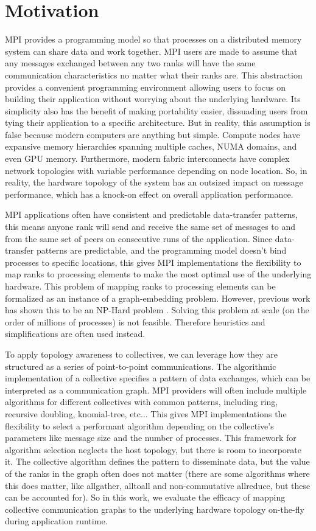 \section{Motivation}
MPI provides a programming model so that processes on a distributed memory system can share data and work together.
MPI users are made to assume that any messages exchanged between any two ranks will have the same communication characteristics no matter what their ranks are. 
This abstraction provides a convenient programming environment allowing users to focus on building their application without worrying about the underlying hardware. 
Its simplicity also has the benefit of making portability easier, dissuading users from tying their application to a specific architecture.
But in reality, this assumption is false because modern computers are anything but simple. 
Compute nodes have expansive memory hierarchies spanning multiple caches, NUMA domains, and even GPU memory.
Furthermore, modern fabric interconnects have complex network topologies with variable performance depending on node location.
So, in reality, the hardware topology of the system has an outsized impact on message performance, which has a knock-on effect on overall application performance. 

MPI applications often have consistent and predictable data-transfer patterns, this means anyone rank will send and receive the same set of messages to and from the same set of peers on consecutive runs of the application.
Since data-transfer patterns are predictable, and the programming model doesn't bind processes to specific locations, this gives MPI implementations the flexibility to map ranks to processing elements to make the most optimal use of the underlying hardware.
This problem of mapping ranks to processing elements can be formalized as an instance of a graph-embedding problem. However, previous work has shown this to be an NP-Hard problem \cite{Hoefler2011GenericTopoMappingStrats}. 
Solving this problem at scale (on the order of millions of processes) is not feasible. Therefore heuristics and simplifications are often used instead.

To apply topology awareness to collectives, we can leverage how they are structured as a series of point-to-point communications.
The algorithmic implementation of a collective specifies a pattern of data exchanges, which can be interpreted as a communication graph.
MPI providers will often include multiple algorithms for different collectives with common patterns, including ring, recursive doubling, knomial-tree, etc...
This gives MPI implementations the flexibility to select a performant algorithm depending on the collective's parameters like message size and the number of processes.
This framework for algorithm selection neglects the host topology, but there is room to incorporate it.
The collective algorithm defines the pattern to disseminate data, but the value of the ranks in the graph often  does not matter (there are some algorithms where this does matter, like allgather, alltoall and non-commutative allreduce, but these can be accounted for).
So in this work, we evaluate the efficacy of mapping collective communication graphs to the underlying hardware topology on-the-fly during application runtime.


